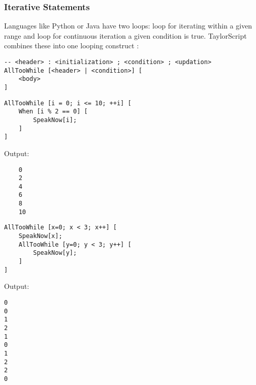 \subsubsection{Iterative Statements}
Languages like Python or Java have two loops:  loop for iterating within a given range and  loop for continuous iteration  a given condition is true. TaylorScript combines these into one looping construct :
\begin{verbatim}
-- <header> : <initialization> ; <condition> ; <updation>
AllTooWhile [<header> | <condition>] [
    <body>
]
\end{verbatim}
\begin{verbatim}
AllTooWhile [i = 0; i <= 10; ++i] [
    When [i % 2 == 0] [
        SpeakNow[i];
    ]
]
\end{verbatim}
Output:
\begin{verbatim}
    0
    2
    4
    6
    8
    10
\end{verbatim}
\begin{verbatim}
AllTooWhile [x=0; x < 3; x++] [
    SpeakNow[x];
    AllTooWhile [y=0; y < 3; y++] [
        SpeakNow[y];
    ]
]
\end{verbatim}
Output:
\begin{verbatim}
0
0
1
2
1
0
1
2
2
0
\end{verbatim}